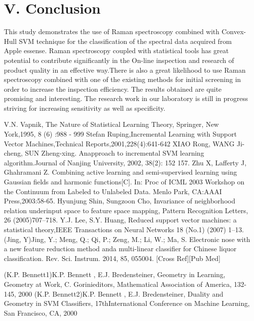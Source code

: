 \documentclass[a4paper]{article}
\begin{document}
\section{V.	Conclusion}
This  study  demonstrates  the  use  of  Raman  spectroscopy  combined  with Convex-Hull SVM  technique  for the  classification  of  the  spectral  data  acquired  from  Apple essense. Raman  spectroscopy  coupled  with  statistical  tools  has  great  potential  to  contribute significantly in the On-line inspection and research of product quality in an effective way.There is also a great  likelihood  to  use  Raman  spectroscopy  combined  with  one  of  the  existing  methods  for initial screening in order to increase the inspection efficiency. The results obtained are quite promising and interesting. The research work in our laboratory is still in progress striving for increasing sensitivity as well as specificity.

\renewcommand\refname{References}
\begin{thebibliography}{99}
    V.N. Vapnik, The Nature of Statistical Learning Theory, Springer, New York,1995, 8 (6) :988 - 999
    Stefan Ruping,Incremental Learning with Support Vector Machines,Technical Reports,2001,228(4):641-642
    XIAO Rong, WANG Ji-cheng, SUN Zheng-xing. Anapproach to incremental SVM learning algorithm.Journal of Nanjing University, 2002, 38(2): 152 157.
    Zhu X, Lafferty J, Ghahramani Z. Combining active learning and semi-supervised learning using Gaussian fields  and  harmonic  functions[C].  In:  Proc  of  ICML  2003  Workshop  on  the  Continuum  from  Labeled  to Unlabeled Data. Menlo Park, CA:AAAI Press,2003:58-65.
    Hyunjung Shin, Sungzoon Cho, Invariance of neighborhood relation underinput space to feature space mapping, Pattern Recognition Letters, 26 (2005)707–718.
    Y.J. Lee, S.Y. Huang, Reduced support vector machines: a statistical theory,IEEE Transactions on Neural Networks 18 (No.1) (2007) 1–13.
    \bibitem(Jing, Y)Jing, Y.; Meng, Q.; Qi, P.; Zeng, M.; Li, W.; Ma, S. Electronic nose with a new feature reduction method anda multi-linear classifier for Chinese liquor classification. Rev. Sci. Instrum. 2014, 85, 055004. [Cross Ref][Pub Med]

    \bibitem(K.P. Bennett1)K.P. Bennett , E.J. Bredensteiner, Geometry in Learning, Geometry at Work, C. Gorinieditors, Mathematical Association of America, 132-145, 2000
    \bibitem(K.P. Bennett2)K.P. Bennett , E.J. Bredensteiner, Duality and Geometry in SVM Classiﬁers, 17thInternational Conference on Machine Learning, San Francisco, CA, 2000
\end{thebibliography}
\end{document}
